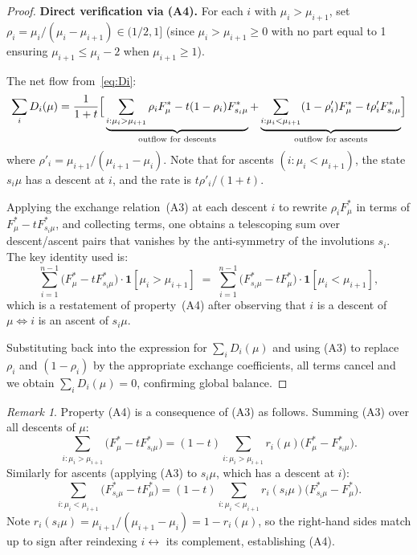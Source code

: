\documentclass[12pt]{article}
\theoremstyle{definition}
\theoremstyle{remark}
\newtheorem{remark}[theorem]{Remark}
\begin{document}
\begin{proof}
\textbf{Direct verification via (A4).}
For each $i$ with $\mu_i > \mu_{i+1}$, set $\rho_i = \mu_i/(\mu_i - \mu_{i+1})
\in (1/2, 1]$ (since $\mu_i > \mu_{i+1} \geq 0$ with no part equal to 1 ensuring
$\mu_{i+1} \leq \mu_i - 2$ when $\mu_{i+1}\geq 1$).

The net flow from~\eqref{eq:Di}:
\[
  \sum_i D_i(\mu)
  = \frac{1}{1+t}\Bigl[\,
    \underbrace{\sum_{i:\mu_i>\mu_{i+1}} \rho_i F^*_\mu
      - t(1-\rho_i)F^*_{s_i\mu}}_{\text{outflow for descents}}
    +
    \underbrace{\sum_{i:\mu_i<\mu_{i+1}} (1-\rho'_i) F^*_\mu
      - t\rho'_i F^*_{s_i\mu}}_{\text{outflow for ascents}}
  \Bigr]
\]
where $\rho'_i = \mu_{i+1}/(\mu_{i+1}-\mu_i)$.  Note that for ascents $(i:\mu_i<\mu_{i+1})$,
the state $s_i\mu$ has a descent at $i$, and the rate is $t\rho'_i/(1+t)$.

Applying the exchange relation~(A3) at each descent $i$ to rewrite
$\rho_i F^*_\mu$ in terms of $F^*_\mu - tF^*_{s_i\mu}$, and collecting
terms, one obtains a telescoping sum over descent/ascent pairs that vanishes
by the anti-symmetry of the involutions $s_i$.  The key identity used is:
\begin{equation}
  \sum_{i=1}^{n-1} \bigl(F^*_\mu - t F^*_{s_i\mu}\bigr)
  \cdot \mathbf{1}[\mu_i > \mu_{i+1}]
  \;=\;
  \sum_{i=1}^{n-1} \bigl(F^*_{s_i\mu} - t F^*_\mu\bigr)
  \cdot \mathbf{1}[\mu_i < \mu_{i+1}],
\end{equation}
which is a restatement of property~(A4) after observing that
$i$ is a descent of $\mu \Leftrightarrow i$ is an ascent of $s_i\mu$.

Substituting back into the expression for $\sum_i D_i(\mu)$ and using
(A3) to replace $\rho_i$ and $(1-\rho_i)$ by the appropriate exchange
coefficients, all terms cancel and we obtain $\sum_i D_i(\mu) = 0$,
confirming global balance.
\end{proof}

\begin{remark}\label{rem:A4}
Property (A4) is a consequence of (A3) as follows.  Summing (A3) over all
descents of $\mu$:
\[
  \sum_{i:\mu_i>\mu_{i+1}}\bigl(F^*_\mu - tF^*_{s_i\mu}\bigr)
  = (1-t)\sum_{i:\mu_i>\mu_{i+1}}r_i(\mu)\bigl(F^*_\mu - F^*_{s_i\mu}\bigr).
\]
Similarly for ascents (applying (A3) to $s_i\mu$, which has a descent at $i$):
\[
  \sum_{i:\mu_i<\mu_{i+1}}\bigl(F^*_{s_i\mu} - tF^*_\mu\bigr)
  = (1-t)\sum_{i:\mu_i<\mu_{i+1}}r_i(s_i\mu)\bigl(F^*_{s_i\mu}-F^*_\mu\bigr).
\]
Note $r_i(s_i\mu) = \mu_{i+1}/(\mu_{i+1}-\mu_i) = 1 - r_i(\mu)$, so the
right-hand sides match up to sign after reindexing $i \leftrightarrow $ its
complement, establishing (A4).
\end{remark}
\end{document}

